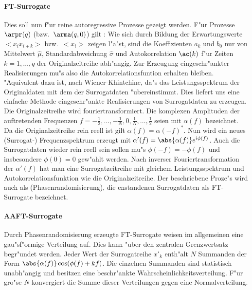 \paragraph{FT-Surrogate}
Dies soll nun f"ur reine autoregressive Prozesse gezeigt werden\footnotemark. F"ur
Prozesse $\arpr(q)$ (bzw.\ $\arma(q,0)$) gilt :
Wie sich durch Bildung der Erwartungswerte $<x_ix_{i+k}>$ bzw.\  $<x_i>$ zeigen l"a"st,
sind die Koeffizienten $a_k$ und $b_0$ nur von Mittelwert $\hat\mu$, Standardabweichung 
$\hat\sigma$ und Autokorrelation $\ac(k)$ f"ur Zeiten $k=1,\dots,q$ der Originalzeitreihe abh"angig. Zur
Erzeugung eingeschr"ankter Realisierungen mu"s also die Autokorrelationsfuntion erhalten
bleiben. "Aquivalent dazu ist, nach Wiener-Khintchine, da"s das Leistungsspektrum der
Originaldaten mit dem der Surrogatdaten "ubereinstimmt. Dies liefert uns eine
einfache Methode eingeschr"ankte Realisierungen von Surrogatdaten zu erzeugen. Die
Originalzeitreihe wird fouriertransformiert.  Die komplexen Amplituden der auftretenden Frequenzen $f=-\frac12, \dots, -\frac1N, 0,
\frac1N, \dots, \frac12$ seien mit  $\alpha(f)$ bezeichnet. Da die Originalzeitreihe rein
reell ist gilt $\alpha(f)=\alpha(-f)^*$. Nun wird ein neues (Surrogat-) Frequenzspektrum
erzeugt mit $\alpha'(f)=\abs{\alpha(f)}e^{i\phi(f)}$. Auch die Surrogatdaten wieder rein
reell sein sollen mu"s $\phi(-f)=-\phi(f)$ und insbesondere $\phi(0)=0$ gew"ahlt
werden. Nach inverser Fouriertransformation der $\alpha'(f)$ hat man eine
Surrogatzeitreihe mit gleichem Leistungsspektrum und Autokorrelationsfunktion wie die Originalzeitreihe.
Der beschriebene Proze"s wird auch als \begriff(Phasenrandomisierung), die enstandenen
Surrogatdaten als FT-Surrogate bezeichnet.


\paragraph{AAFT-Surrogate}
Durch Phasenrandomisierung erzeugte FT-Surrogate weisen im allgemeinen eine gau"sf"ormige
Verteilung auf. Dies kann "uber den zentralen Grenzwertsatz begr"undet werden. Jeder Wert
der Surrogatreihe $x'_k$ enth"alt $N$ Summanden der Form
$\abs{\alpha(f)}\cos(\phi(f)+kf)$. Die einzelnen Summanden sind statistisch unabh"angig
und besitzen eine beschr"ankte Wahrscheinlichkeitsverteilung. F"ur gro"se $N$ konvergiert
die Summe dieser Verteilungen gegen eine Normalverteilung. 

